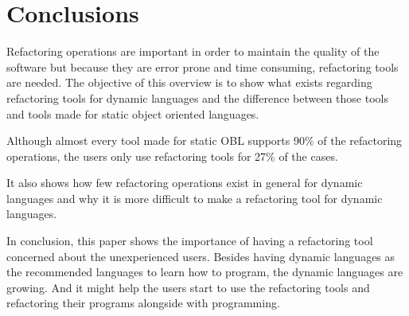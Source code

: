 
% 
% 

\section{Conclusions}



Refactoring operations are important in order to maintain the quality of the software but because they are error prone and time consuming, refactoring tools are needed.
The objective of this overview is to show what exists regarding refactoring tools for dynamic languages and the difference between those tools and tools made for static object oriented languages.


Although almost every tool made for static OBL supports 90\% of the refactoring operations, the users only use refactoring tools for 27\% of the cases. %

It also shows how few refactoring operations exist in general for dynamic languages and why it is more difficult to make a refactoring tool for dynamic languages.

In conclusion, this paper shows the importance of having a refactoring tool concerned about the unexperienced users. Besides having dynamic languages as the recommended languages to learn how to program, the dynamic languages are growing. And it might help the users start to use the refactoring tools and refactoring their programs alongside with programming.


